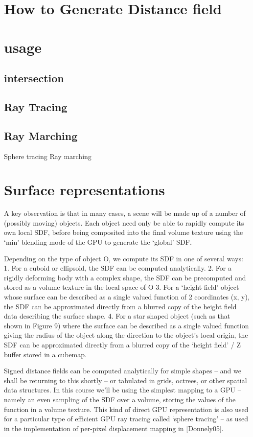\section*{How to Generate Distance field}
\section*{usage}
\subsection*{intersection}
\subsection*{Ray Tracing}
\subsection{Ray Marching}

Sphere tracing 
Ray marching

\section{Surface representations}

A key observation is that in many cases, a scene will be made up of a number of (possibly moving) objects. Each object need only be able to rapidly compute its own local SDF, before being composited into the final volume texture using the ‘min’ blending mode of the GPU to generate the ‘global’ SDF.

Depending on the type of object O, we compute its SDF in one of several ways:
1. For a cuboid or ellipsoid, the SDF can be computed analytically.
2. For a rigidly deforming body with a complex shape, the SDF can be precomputed and stored as a volume texture in the local space of O
3. For a ‘height field’ object whose surface can be described as a single valued function of 2 coordinates (x, y), the SDF can be approximated directly from a blurred copy of the height field data describing the surface shape.
4. For a star shaped object (such as that shown in Figure 9) where the surface can be described as a single valued function giving the radius of the object along the direction to the object’s local origin, the SDF can be approximated directly from a blurred copy of the ‘height field’ / Z buffer stored in a cubemap.

Signed distance fields can be computed analytically for simple shapes – and we shall be returning to this shortly – or tabulated in grids, octrees, or other spatial data structures. In this course we’ll be using the simplest mapping to a GPU – namely an even sampling of the SDF over a volume, storing the values of the function in a volume texture. This kind of direct GPU representation is also used for a particular type of efficient GPU ray tracing called ‘sphere tracing’ – as used in the implementation of per-pixel displacement mapping in [Donnely05].


